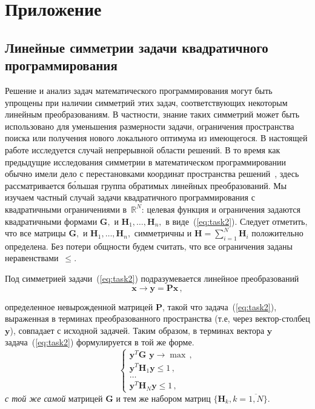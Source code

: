 \documentclass{llncs}
\begin{document}
\section*{Приложение}\label{sec:sym}
\subsection*{Линейные симметрии задачи квадратичного программирования}\label{sec:sym:mod}

Решение и анализ задач математического программирования могут быть упрощены при наличии симметрий этих задач, соответствующих некоторым линейным преобразованиям. В частности, знание таких симметрий может быть использовано для уменьшения размерности задачи, ограничения пространства поиска или получения нового локального оптимума из имеющегося.
В настоящей работе исследуется случай непрерывной области решений. В то время как предыдущие исследования симметрии в математическом программировании обычно имели дело с перестановками координат пространства решений~\cite{Kolokolov2012,KWM19,L12}, здесь рассматривается б\'{о}льшая группа обратимых линейных преобразований. Мы изучаем частный случай задачи квадратичного программирования с квадратичными ограничениями в~${\mathbb R}^N$: целевая функция и ограничения задаются квадратичными формами $\textbf{G}, $ и $\textbf{H}_1,\dots,\textbf{H}_n,$ в виде~(\ref{eq:task2}). Следует отметить, что все матрицы $\textbf{G}, $ и $\textbf{H}_1,\dots,\textbf{H}_n,$ симметричны и $\textbf{H} = \sum_{i=1}^{N}\textbf{H}_i$ положительно определена.
Без потери общности будем считать, что все ограничения заданы неравенствами~$\le$.

Под симметрией задачи~(\ref{eq:task2}) подразумевается линейное преобразований
\begin{equation}
\label{eq:Lin}
\textbf{x} \to \textbf{y}=\textbf{Px} \, ,
\end{equation}
%

определенное невырожденной матрицей $\textbf{P}$, такой что задача~(\ref{eq:task2}), выраженная в терминах преобразованного пространства
(т.е, через вектор-столбец $\textbf{y} $), совпадает с исходной задачей. Таким образом, в терминах вектора $\textbf{y}$ задача~(\ref{eq:task2}) формулируется в той же форме.
%
\begin{equation}
\label{eq:Tinit}
\left\{
\begin{array}{l}
\displaystyle
\textbf{y}^T \textbf{G y} \to {\max} \, , \\
\displaystyle
\textbf{y}^T\textbf{H}_1\textbf{y} \le  1 \, , \\
\displaystyle
\dots \\
\textbf{y}^T\textbf{H}_N\textbf{y} \le 1 \, ,
\end{array}
\right.
\end{equation}
%
\textit{с той же самой} матрицей $\textbf{G} $ и тем же набором матриц $\{\textbf{H}_k, k = \overline{1,N}\}$.
\end{document}
